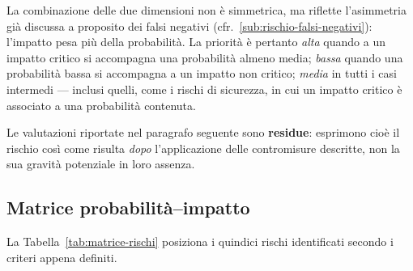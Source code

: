 La combinazione delle due dimensioni non è simmetrica, ma riflette l'asimmetria già discussa a proposito dei falsi negativi (cfr.~\ref{sub:rischio-falsi-negativi}): l'impatto pesa più della probabilità. La priorità è pertanto \textit{alta} quando a un impatto critico si accompagna una probabilità almeno media; \textit{bassa} quando una probabilità bassa si accompagna a un impatto non critico; \textit{media} in tutti i casi intermedi --- inclusi quelli, come i rischi di sicurezza, in cui un impatto critico è associato a una probabilità contenuta. \medskip

Le valutazioni riportate nel paragrafo seguente sono \textbf{residue}: esprimono cioè il rischio così come risulta \emph{dopo} l'applicazione delle contromisure descritte, non la sua gravità potenziale in loro assenza.

\subsection{Matrice probabilità--impatto}
\label{sub:matrice-probabilita-impatto}
La Tabella~\ref{tab:matrice-rischi} posiziona i quindici rischi identificati secondo i criteri appena definiti. \medskip


